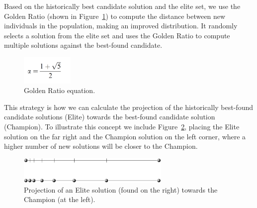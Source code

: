 \documentclass[graybox]{svmult}
\begin{document}
            
            Based on the historically best candidate
            solution and the elite set, we use the Golden Ratio (shown in
            Figure~\ref{fig.golden_ratio}) to compute the distance between new individuals
            in the population, making an improved distribution. It randomly selects a
            solution from the elite set and uses the Golden Ratio 
            \cite{nematollahi2020novel, gaikwad2021face, khesin2022golden, sym13081334, https://doi.org/10.1111/nyas.14895} 
            to compute multiple solutions against the best-found candidate.

            \begin{figure}
                \centering
                \includegraphics[width=25mm]{img/fig_golden_ratio.pdf}
                \caption{Golden Ratio equation.} \label{fig.golden_ratio}
                \end{figure}

            This strategy is how we can calculate the projection of the historically
            best-found candidate solutions (Elite) towards the best-found candidate
            solution (Champion). To illustrate this concept we include
            Figure~\ref{fig.elite_projection}, placing the Elite solution on the far right
            and the Champion solution on the left corner, where a higher number of new
            solutions will be closer to the Champion.

            \begin{figure}
                \centering
                \includegraphics[width=0.65\textwidth]{img/fig_elite_projection.pdf}
                \caption{Projection of an Elite solution (found on the right) towards the Champion (at the left).} \label{fig.elite_projection}
                \end{figure}
\end{document}
